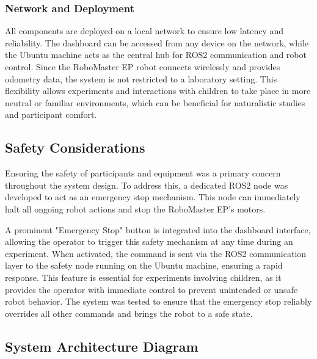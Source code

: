\documentclass[a4paper]{usiinfbachelorproject}
\begin{document}
\subsubsection*{\textbf{Network and Deployment}}
All components are deployed on a local network to ensure low latency and reliability.
The dashboard can be accessed from any device on the network, while the Ubuntu machine acts as the central hub for ROS2 communication and robot control.
Since the RoboMaster EP robot connects wirelessly and provides odometry data, the system is not restricted to a laboratory setting.
This flexibility allows experiments and interactions with children to take place in more neutral or familiar environments, which can be beneficial for naturalistic studies and participant comfort.

\subsection{\textbf{Safety Considerations}}
Ensuring the safety of participants and equipment was a primary concern throughout the system design.
To address this, a dedicated ROS2 node was developed to act as an emergency stop mechanism.
This node can immediately halt all ongoing robot actions and stop the RoboMaster EP's motors.

A prominent "Emergency Stop" button is integrated into the dashboard interface, allowing the operator to trigger this safety mechanism at any time during an experiment.
When activated, the command is sent via the ROS2 communication layer to the safety node running on the Ubuntu machine, ensuring a rapid response.
This feature is essential for experiments involving children, as it provides the operator with immediate control to prevent unintended or unsafe robot behavior.
The system was tested to ensure that the emergency stop reliably overrides all other commands and brings the robot to a safe state.

\subsection{\textbf{System Architecture Diagram}}
\end{document}
